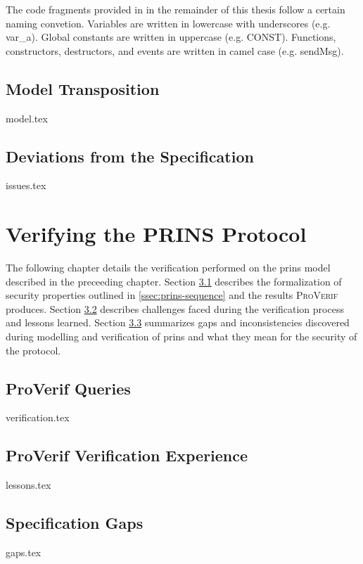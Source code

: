\documentclass[a4paper,12pt,twoside]{report}
\begin{document}
The code fragments provided in in the remainder of this thesis follow a certain naming convetion.
Variables are written in lowercase with underscores (e.g.  {\sffamily var\_a}).
Global constants are written in uppercase (e.g.  {\sffamily CONST}).
Functions, constructors, destructors, and events are written in camel case (e.g.  {\sffamily sendMsg}).

\section{Model Transposition}
\label{sec:model}
{model.tex}

\section{Deviations from the Specification}
\label{sec:issues}
{issues.tex}

\clearpage

\chapter{Verifying the PRINS Protocol}
\label{chap:verification}

The following chapter details the verification performed on the \gls{prins} model described in the preceeding chapter.
Section \ref{sec:verification} describes the formalization of security properties outlined in \ref{ssec:prins-sequence} and the results \textsc{ProVerif} produces.
Section \ref{sec:lessons} describes challenges faced during the verification process and lessons learned.
Section \ref{sec:gaps} summarizes gaps and inconsistencies discovered during modelling and verification of \gls{prins} and what they mean for the security of the protocol.

\section{ProVerif Queries}
\label{sec:verification}
{verification.tex}

\section{ProVerif Verification Experience}
\label{sec:lessons}
{lessons.tex}

\section{Specification Gaps}
\label{sec:gaps}
{gaps.tex}
\end{document}
